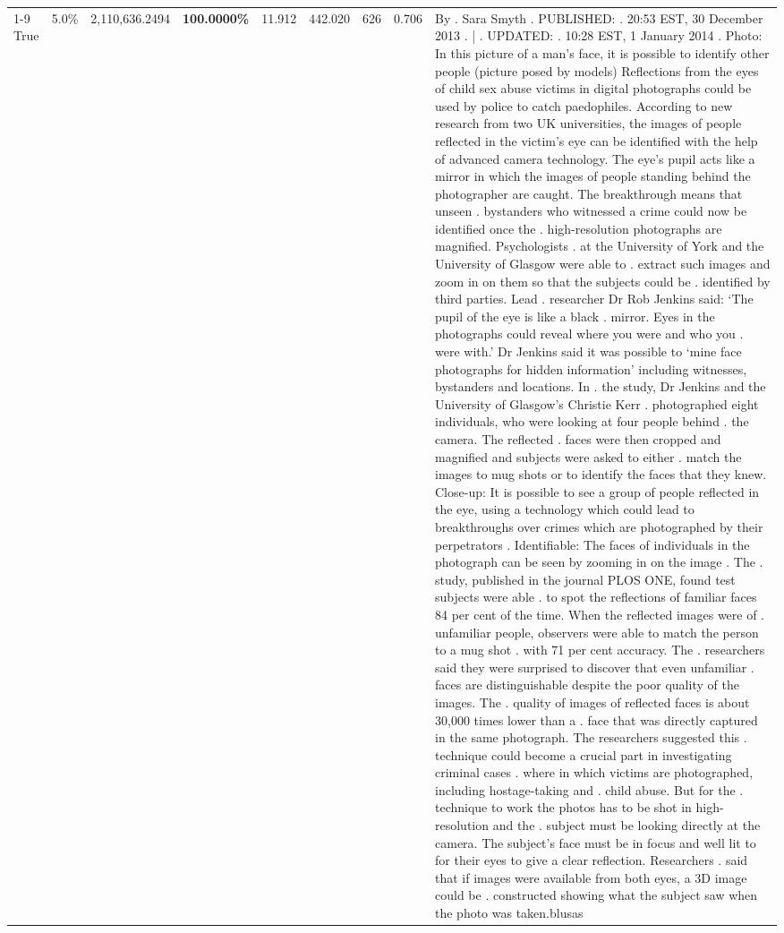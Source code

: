 \begin{table}[H]
\begin{tabular}{lllrlllll}
\cline{1-9}
True & 5.0\% & 2,110,636.2494 & \bfseries \color{red} 100.0000\% & 11.912 & 442.020 & 626 & 0.706 & By . Sara Smyth . PUBLISHED: . 20:53 EST, 30 December 2013 . | . UPDATED: . 10:28 EST, 1 January 2014 . Photo: In this picture of a man's face, it is possible to identify other people (picture posed by models) Reflections from the eyes of child sex abuse victims in digital photographs could be used by police to catch paedophiles. According to new research from two UK universities, the images of people reflected in the victim's eye can be identified with the help of advanced camera technology. The eye's pupil acts like a mirror in which the images of people standing behind the photographer are caught. The breakthrough means that unseen . bystanders who witnessed a crime could now be identified once the . high-resolution photographs are magnified. Psychologists . at the University of York and the University of Glasgow were able to . extract such images and zoom in on them so that the subjects could be . identified by third parties. Lead . researcher Dr Rob Jenkins said: ‘The pupil of the eye is like a black . mirror. Eyes in the photographs could reveal where you were and who you . were with.' Dr Jenkins said it was possible to ‘mine face photographs for hidden information' including witnesses, bystanders and locations. In . the study, Dr Jenkins and the University of Glasgow's Christie Kerr . photographed eight individuals, who were looking at four people behind . the camera. The reflected . faces were then cropped and magnified and subjects were asked to either . match the images to mug shots or to identify the faces that they knew. Close-up: It is possible to see a group of people reflected in the eye, using a technology which could lead to breakthroughs over crimes which are photographed by their perpetrators . Identifiable: The faces of individuals in the photograph can be seen by zooming in on the image . The . study, published in the journal PLOS ONE, found test subjects were able . to spot the reflections of familiar faces 84 per cent of the time. When the reflected images were of . unfamiliar people, observers were able to match the person to a mug shot . with 71 per cent accuracy. The . researchers said they were surprised to discover that even unfamiliar . faces are distinguishable despite the poor quality of the images. The . quality of images of reflected faces is about 30,000 times lower than a . face that was directly captured in the same photograph. The researchers suggested this . technique could become a crucial part in investigating criminal cases . where in which victims are photographed, including hostage-taking and . child abuse. But for the . technique to work the photos has to be shot in high-resolution and the . subject must be looking directly at the camera. The subject's face must be in focus and well lit to for their eyes to give a clear reflection. Researchers . said that if images were available from both eyes, a 3D image could be . constructed showing what the subject saw when the photo was taken.blusas \\

\end{tabular}
\end{table}
